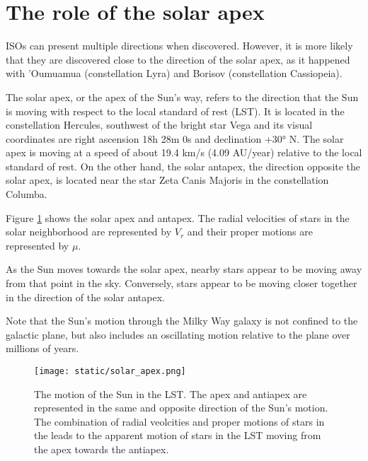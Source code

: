 \section{The role of the solar apex}


ISOs can present multiple directions when discovered. However, it is more likely
that they are discovered close to the direction of the solar apex, as it
happened with 'Oumuamua (constellation Lyra) and Borisov (constellation
Cassiopeia).

The solar apex, or the apex of the Sun's way, refers to the direction that the
Sun is moving with respect to the local standard of rest (LST). It is located in
the constellation Hercules, southwest of the bright star Vega and its visual
coordinates are right ascension 18h 28m 0s and declination +30° N. The solar
apex is moving at a speed of about 19.4 km/s (4.09 AU/year) relative to the
local standard of rest. On the other hand, the solar antapex, the direction
opposite the solar apex, is located near the star Zeta Canis Majoris in the
constellation Columba. 

Figure \ref{fig:solar_apex} shows the solar apex and antapex. The radial
velocities of stars in the solar neighborhood are represented by $V_r$ and their
proper motions are represented by $\mu$.

As the Sun moves towards the solar apex, nearby stars appear to be moving
away from that point in the sky. Conversely, stars appear to be moving closer
together in the direction of the solar antapex.

Note that the Sun's motion through the Milky Way galaxy is not confined to the
galactic plane, but also includes an oscillating motion relative to the plane
over millions of years.

\begin{figure}[H]
  \centering
  \texttt{[image: static/solar\_apex.png]}
        \caption[The motion of the Sun in the LST.]
        {
          The motion of the Sun in the LST. The apex and antiapex are
          represented in the same and opposite direction of the Sun's motion.
          The combination of radial veolcities and proper motions of stars in the
          leads to the apparent motion of stars in the LST moving from the apex
          towards the antiapex.
        }
\label{fig:solar_apex}
\end{figure}
